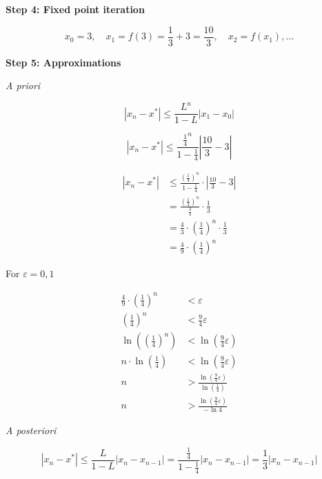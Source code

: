 \textbf{Step 4: Fixed point iteration}

\[
    x_0 = 3, \quad x_1 = f(3) = \frac{1}{3} + 3 = \frac{10}{3}, \quad x_2 = f(x_1), \dots
\]

\textbf{Step 5: Approximations}

\emph{A priori}

\[
    |x_n - x^*| \le \frac{L^n}{1 - L} |x_1 - x_0|
\]

\[
    |x_n - x^*| \le \frac{\frac{1}{4}^n}{1 - \frac{1}{4}} |\frac{10}{3}  - 3|
\]

\begin{align*}
    |x_n - x^*| &\le \frac{\left(\frac{1}{4}\right)^n}{1 - \frac{1}{4}} \cdot \left|\frac{10}{3} - 3\right| \\
    &= \frac{\left(\frac{1}{4}\right)^n}{\frac{3}{4}} \cdot \frac{1}{3}\\
    &= \frac{4}{3} \cdot \left(\frac{1}{4}\right)^n \cdot \frac{1}{3}\\
    &= \frac{4}{9} \cdot \left(\frac{1}{4}\right)^n
\end{align*}

For \(\varepsilon = 0,1\)

\begin{align*}
    \frac{4}{9} \cdot \left(\frac{1}{4}\right)^n &< \varepsilon \\
    \left(\frac{1}{4}\right)^n &< \frac{9}{4} \varepsilon \\
    \ln\left(\left(\frac{1}{4}\right)^n\right) &< \ln\left(\frac{9}{4} \varepsilon\right) \\
    n \cdot \ln\left(\frac{1}{4}\right) &< \ln\left(\frac{9}{4} \varepsilon\right) \\
    n &> \frac{\ln\left(\frac{9}{4} \varepsilon\right)}{\ln\left(\frac{1}{4}\right)} \\
    n &> \frac{\ln\left(\frac{9}{4} \varepsilon\right)}{-\ln 4}
\end{align*}


\emph{A posteriori}

\[
    |x_n - x^*| \le \frac{L}{1 - L} |x_n - x_{n-1}| = \frac{\frac{1}{4}}{1 - \frac{1}{4}} |x_n - x_{n-1}| = \frac{1}{3} |x_n - x_{n-1}|
\]

